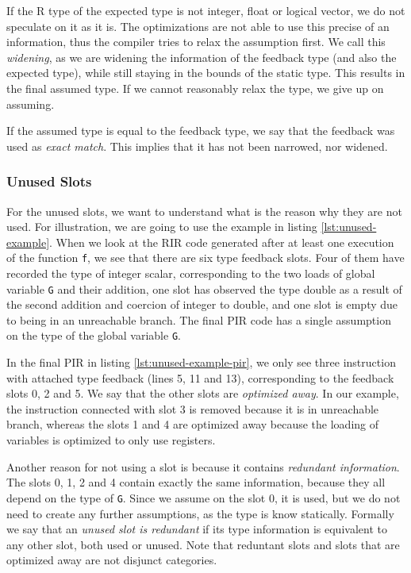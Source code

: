 If the R type of the expected type is not integer, float or logical vector, we do not speculate on it as it is. The optimizations are not able to use this precise of an information, thus the compiler tries to relax the assumption first. We call this \textit{widening}, as we are widening the information of the feedback type (and also the expected type), while still staying in the bounds of the static type. This results in the final assumed type. If we cannot reasonably relax the type, we give up on assuming.

If the assumed type is equal to the feedback type, we say that the feedback was used as \textit{exact match}. This implies that it has not been narrowed, nor widened.

\subsubsection*{Unused Slots}


For the unused slots, we want to understand what is the reason why they are not used. For illustration, we are going to use the example in listing \ref{lst:unused-example}. When we look at the RIR code generated after at least one execution of the function \texttt{f}, we see that there are six type feedback slots. Four of them have recorded the type of integer scalar, corresponding to the two loads of global variable \texttt{G} and their addition, one slot has observed the type double as a result of the second addition and coercion of integer to double, and one slot is empty due to being in an unreachable branch. The final PIR code has a single assumption on the type of the global variable \texttt{G}.

In the final PIR in listing \ref{lst:unused-example-pir}, we only see three instruction with attached type feedback (lines 5, 11 and 13), corresponding to the feedback slots 0, 2 and 5. We say that the other slots are \textit{optimized away}. In our example, the instruction connected with slot 3 is removed because it is in unreachable branch, whereas the slots 1 and 4 are optimized away because the loading of variables is optimized to only use registers.

Another reason for not using a slot is because it contains \textit{redundant information}. The slots 0, 1, 2 and 4 contain exactly the same information, because they all depend on the type of \texttt{G}. Since we assume on the slot 0, it is used, but we do not need to create any further assumptions, as the type is know statically. Formally we say that an \textit{unused slot is redundant} if its type information is equivalent to any other slot, both used or unused. Note that reduntant slots and slots that are optimized away are not disjunct categories.

